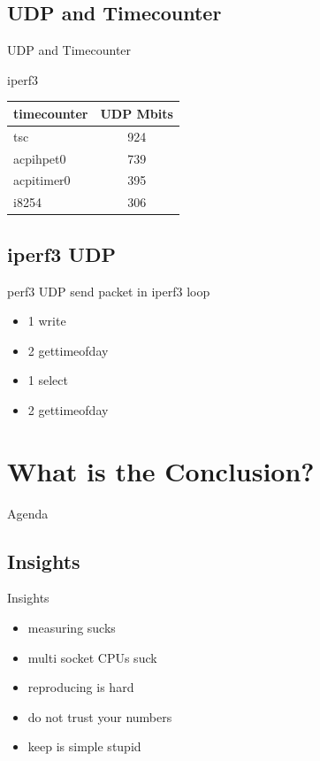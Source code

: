\documentclass[14pt,aspectratio=169]{beamer}
\begin{document}
\subsection{UDP and Timecounter}
\begin{frame}{UDP and Timecounter}
\begin{center}
iperf3

\vspace{1cm}
\begin{tabular}{l|c}
    timecounter	& UDP Mbits \\
    \hline
    tsc		& 924 \\
    acpihpet0	& 739 \\
    acpitimer0	& 395 \\
    i8254	& 306 \\
\end{tabular}
\end{center}
\end{frame}

\subsection{iperf3 UDP}
\begin{frame}{perf3 UDP}
send packet in iperf3 loop
\begin{itemize}
    \item 1 write
    \item 2 gettimeofday
    \item 1 select
    \item 2 gettimeofday
\end{itemize}
\end{frame}

\section{What is the Conclusion?}

\begin{frame}{Agenda}
\setcounter{tocdepth}{1}
\tableofcontents[currentsection]
\end{frame}

\subsection{Insights}
\begin{frame}{Insights}
\begin{itemize}
    \item measuring sucks
    \item multi socket CPUs suck
    \item reproducing is hard
    \item do not trust your numbers
    \item keep is simple stupid
\end{itemize}
\end{frame}
\end{document}
